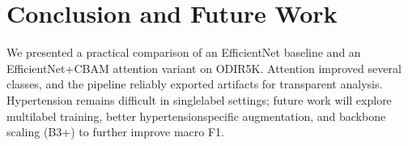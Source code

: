 \chapter{Conclusion and Future Work}
We presented a practical comparison of an EfficientNet baseline and an EfficientNet+CBAM attention variant on ODIR\textendash 5K. Attention improved several classes, and the pipeline reliably exported artifacts for transparent analysis. Hypertension remains difficult in single\textendash label settings; future work will explore multi\textendash label training, better hypertension\textendash specific augmentation, and backbone scaling (B3+) to further improve macro F1.

